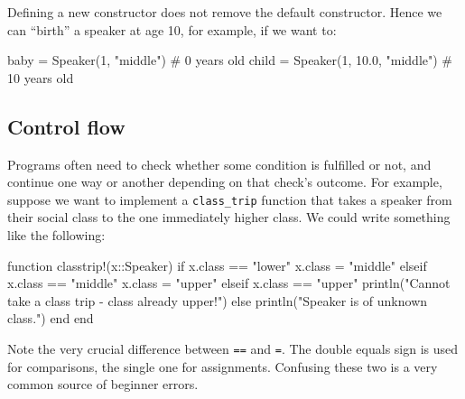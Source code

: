 \documentclass[
  letterpaper,
  DIV=11,
  numbers=noendperiod]{scrartcl}
\newenvironment{Shaded}{\begin{snugshade}}{\end{snugshade}}
\newcommand{\CommentTok}[1]{\textcolor[rgb]{0.37,0.37,0.37}{#1}}
\newcommand{\ControlFlowTok}[1]{\textcolor[rgb]{0.00,0.23,0.31}{#1}}
\newcommand{\DataTypeTok}[1]{\textcolor[rgb]{0.68,0.00,0.00}{#1}}
\newcommand{\FloatTok}[1]{\textcolor[rgb]{0.68,0.00,0.00}{#1}}
\newcommand{\FunctionTok}[1]{\textcolor[rgb]{0.28,0.35,0.67}{#1}}
\newcommand{\KeywordTok}[1]{\textcolor[rgb]{0.00,0.23,0.31}{#1}}
\newcommand{\NormalTok}[1]{\textcolor[rgb]{0.00,0.23,0.31}{#1}}
\newcommand{\OperatorTok}[1]{\textcolor[rgb]{0.37,0.37,0.37}{#1}}
\newcommand{\StringTok}[1]{\textcolor[rgb]{0.13,0.47,0.30}{#1}}
\begin{document}
Defining a new constructor does not remove the default constructor.
Hence we can ``birth'' a speaker at age 10, for example, if we want to:

\begin{Shaded}
\begin{Highlighting}[]
\NormalTok{baby }\OperatorTok{=} \FunctionTok{Speaker}\NormalTok{(}\FloatTok{1}\NormalTok{, }\StringTok{"middle"}\NormalTok{) }\CommentTok{\# 0 years old}
\NormalTok{child }\OperatorTok{=} \FunctionTok{Speaker}\NormalTok{(}\FloatTok{1}\NormalTok{, }\FloatTok{10.0}\NormalTok{, }\StringTok{"middle"}\NormalTok{) }\CommentTok{\# 10 years old}
\end{Highlighting}
\end{Shaded}

\subsection{Control flow}\label{control-flow}

Programs often need to check whether some condition is fulfilled or not,
and continue one way or another depending on that check's outcome. For
example, suppose we want to implement a \texttt{class\_trip} function
that takes a speaker from their social class to the one immediately
higher class. We could write something like the following:

\begin{Shaded}
\begin{Highlighting}[]
\KeywordTok{function} \FunctionTok{classtrip!}\NormalTok{(x}\OperatorTok{::}\DataTypeTok{Speaker}\NormalTok{)}
  \ControlFlowTok{if}\NormalTok{ x.class }\OperatorTok{==} \StringTok{"lower"}
\NormalTok{    x.class }\OperatorTok{=} \StringTok{"middle"}
  \ControlFlowTok{elseif}\NormalTok{ x.class }\OperatorTok{==} \StringTok{"middle"}
\NormalTok{    x.class }\OperatorTok{=} \StringTok{"upper"}
  \ControlFlowTok{elseif}\NormalTok{ x.class }\OperatorTok{==} \StringTok{"upper"}
    \FunctionTok{println}\NormalTok{(}\StringTok{"Cannot take a class trip {-} class already upper!"}\NormalTok{)}
  \ControlFlowTok{else}
    \FunctionTok{println}\NormalTok{(}\StringTok{"Speaker is of unknown class."}\NormalTok{)}
  \ControlFlowTok{end}
\KeywordTok{end}
\end{Highlighting}
\end{Shaded}

\begin{tcolorbox}[enhanced jigsaw, left=2mm, colbacktitle=quarto-callout-note-color!10!white, titlerule=0mm, breakable, arc=.35mm, opacitybacktitle=0.6, coltitle=black, opacityback=0, toprule=.15mm, bottomrule=.15mm, colframe=quarto-callout-note-color-frame, bottomtitle=1mm, rightrule=.15mm, leftrule=.75mm, colback=white, toptitle=1mm, title=\textcolor{quarto-callout-note-color}{\faInfo}\hspace{0.5em}{Note}]

Note the very crucial difference between \texttt{==} and \texttt{=}. The
double equals sign is used for comparisons, the single one for
assignments. Confusing these two is a very common source of beginner
errors.

\end{tcolorbox}
\end{document}
